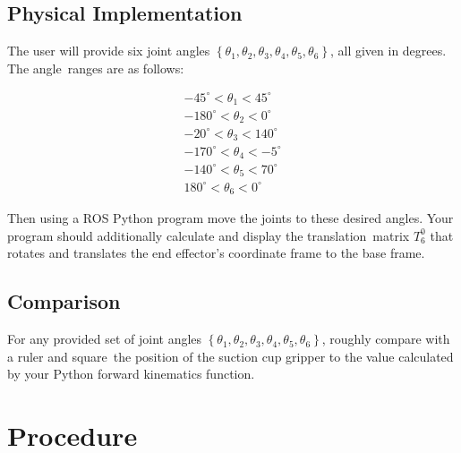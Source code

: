 \subsection{Physical Implementation}
The user will provide six joint angles $\left\{\theta_1,\theta_2,\theta_3,\theta_4,\theta_5,\theta_6\right\}$, all given in degrees.  The angle\
ranges are as follows:

\begin{eqnarray*}
-45^{\circ}<\theta_1<45^{\circ}\\
-180^{\circ}<\theta_2<0^{\circ}\\
-20^{\circ}<\theta_3<140^{\circ}\\
-170^{\circ}<\theta_4<-5^{\circ}\\
-140^{\circ}<\theta_5<70^{\circ}\\
180^{\circ}<\theta_6<0^{\circ}
\end{eqnarray*}

Then using a ROS Python program move the joints to these desired angles.  Your program should additionally calculate and display the translation\
matrix $T_6^0$ that rotates and translates the end effector's coordinate frame to the base frame.

\subsection{Comparison}
For any provided set of joint angles $\left\{\theta_1,\theta_2,\theta_3,\theta_4,\theta_5,\theta_6\right\}$, roughly compare with a ruler and square\
the position of the suction cup gripper to the value calculated by your Python forward kinematics function.  

\section{Procedure}
	
